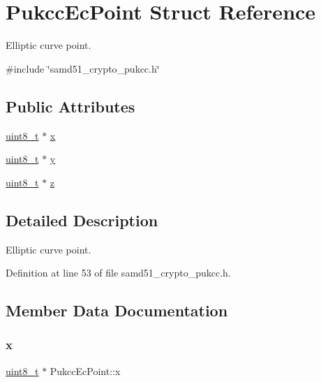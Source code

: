 \hypertarget{structPukccEcPoint}{}\section{Pukcc\+Ec\+Point Struct Reference}
\label{structPukccEcPoint}


Elliptic curve point.  




{\ttfamily \#include \char`\"{}samd51\+\_\+crypto\+\_\+pukcc.\+h\char`\"{}}

\subsection*{Public Attributes}
\begin{DoxyCompactItemize}
\item 
\hyperlink{stdint_8h_aba7bc1797add20fe3efdf37ced1182c5}{uint8\+\_\+t} $\ast$ \hyperlink{structPukccEcPoint_ae3c213e2c33cf57679f00aa6d49765bf}{x}
\item 
\hyperlink{stdint_8h_aba7bc1797add20fe3efdf37ced1182c5}{uint8\+\_\+t} $\ast$ \hyperlink{structPukccEcPoint_aa4efb7c13982bb8c7dbb8805a7798d9b}{y}
\item 
\hyperlink{stdint_8h_aba7bc1797add20fe3efdf37ced1182c5}{uint8\+\_\+t} $\ast$ \hyperlink{structPukccEcPoint_a4c9d0fd92c00c7bf6bd0d8c9584c1f62}{z}
\end{DoxyCompactItemize}


\subsection{Detailed Description}
Elliptic curve point. 

Definition at line 53 of file samd51\+\_\+crypto\+\_\+pukcc.\+h.



\subsection{Member Data Documentation}
\mbox{\label{structPukccEcPoint_ae3c213e2c33cf57679f00aa6d49765bf}} 
\subsubsection{\texorpdfstring{x}{x}}
{\footnotesize\ttfamily \hyperlink{stdint_8h_aba7bc1797add20fe3efdf37ced1182c5}{uint8\+\_\+t} $\ast$ Pukcc\+Ec\+Point\+::x}



